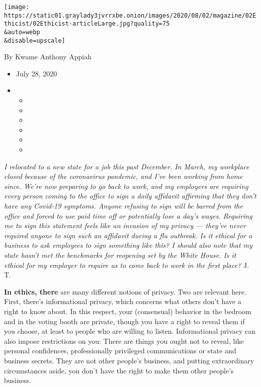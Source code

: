 \texttt{[image: https://static01.graylady3jvrrxbe.onion/images/2020/08/02/magazine/02Ethicist/02Ethicist-articleLarge.jpg?quality=75\\\&auto=webp\\\&disable=upscale]}

By Kwame Anthony Appiah

\begin{itemize}
\item
  July 28, 2020
\item
  \begin{itemize}
  \item
  \item
  \item
  \item
  \item
  \item
  \end{itemize}
\end{itemize}

\emph{I relocated to a new state for a job this past December. In March,
my workplace closed because of the coronavirus pandemic, and I've been
working from home since. We're now preparing to go back to work, and my
employers are requiring every person coming to the office to sign a
daily affidavit affirming that they don't have any Covid-19 symptoms.
Anyone refusing to sign will be barred from the office and forced to use
paid time off or potentially lose a day's wages. Requiring me to sign
this statement feels like an invasion of my privacy --- they've never
required anyone to sign such an affidavit during a flu outbreak. Is it
ethical for a business to ask employees to sign something like this? I
should also note that my state hasn't met the benchmarks for reopening
set by the White House. Is it ethical for my employer to require us to
come back to work in the first place?} J. T.

\textbf{In ethics, there} are many different notions of privacy. Two are
relevant here. First, there's informational privacy, which concerns what
others don't have a right to know about. In this respect, your
(consensual) behavior in the bedroom and in the voting booth are
private, though you have a right to reveal them if you choose, at least
to people who are willing to listen. Informational privacy can also
impose restrictions on you: There are things you ought not to reveal,
like personal confidences, professionally privileged communications or
state and business secrets. They are not other people's business, and
putting extraordinary circumstances aside, you don't have the right to
make them other people's business.

